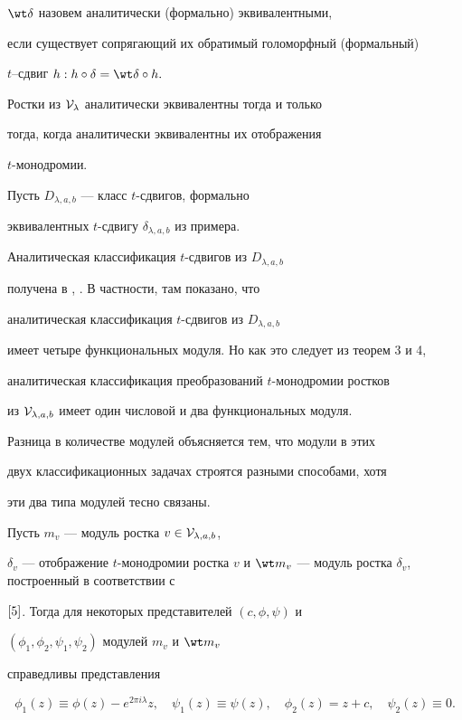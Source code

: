 $\wt \delta$ назовем аналитически (формально) эквивалентными,


если существует сопрягающий их обратимый голоморфный (формальный)


$t$--сдвиг $ h:h\circ \delta=\wt \delta \circ h. $





\begin{thm}


Ростки из ${\cal V}_\lambda$ аналитически эквивалентны тогда и только


тогда, когда аналитически эквивалентны их отображения


$t$-монодромии.


\end{thm}





Пусть $D_{\lambda,a,b}$ --- класс $t$-сдвигов, формально


эквивалентных $t$-сдвигу $\delta_{\lambda,a,b}$ из примера.


Аналитическая классификация $t$-сдвигов из $D_{\lambda,a,b}$


получена в \cite{3}, \cite{5}. В частности, там показано, что


аналитическая классификация $t$-сдвигов из $D_{\lambda,a,b}$


имеет четыре функциональных модуля. Но как это следует из теорем 3 и 4,


аналитическая классификация преобразований $t$-монодромии ростков


из ${\cal V}_{\lambda,a,b}$ имеет один числовой и два функциональных модуля.


Разница в количестве модулей объясняется тем, что модули в этих


двух классификационных задачах строятся разными способами, хотя


эти два типа модулей тесно связаны.





\begin{thm}


Пусть $m_v$ --- модуль ростка $v\in {\cal V}_{\lambda,a,b}$,


$\delta_v$ --- отображение $t$-монодромии ростка $v$ и $\wt


m_v$ --- модуль ростка $\delta_v$, построенный в соответствии с


$\cite{5}$. Тогда для некоторых представителей $(c,\phi,\psi)$ и


$(\phi_1,\phi_2,\psi_1,\psi_2)$ модулей $m_v$ и $\wt m_v$


справедливы представления


$$


\phi_1(z)\equiv \phi(z)-e^{2\pi


i\lambda}z,\quad \psi_1(z)\equiv \psi(z), \quad


\phi_2(z)=z+c,\quad \psi_2(z)\equiv 0.


$$


\end{thm}





